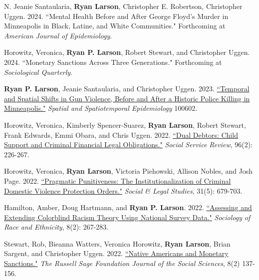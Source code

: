 \documentclass[letterpaper]{article}
\renewenvironment{itemize}{
  \begin{list}{}{
    \setlength{\leftmargin}{1.5em}
  }
}{
  \end{list}
}
\begin{document}
\begin{itemize}

\item N. Jeanie Santaularia, \textbf{Ryan Larson}, Christopher E. Robertson, Christopher Uggen. 2024. ``Mental Health Before and After George Floyd’s Murder in Minneapolis in Black, Latine, and White Communities." Forthcoming at \textit{American Journal of Epidemiology}. 

\item Horowitz, Veronica, \textbf{Ryan P. Larson}, Robert Stewart, and Christopher Uggen. 2024. ``Monetary Sanctions Across Three Generations." Forthcoming at \textit{Sociological Quarterly}.

\item \textbf{Ryan P. Larson}, Jeanie Santaularia, and Christopher Uggen. 2023. \href{https://ryanplarson.github.io/personal_site/pubs/larson_etal_23_online.pdf}{``Temporal and Spatial Shifts in Gun Violence, Before and After a Historic Police Killing in Minneapolis."} \textit{Spatial and Spatiotemporal Epidemiology} 100602.

\item Horowitz, Veronica, Kimberly Spencer-Suarez, \textbf{Ryan Larson}, Robert Stewart, Frank Edwards, Emmi Obara, and Chris Uggen. 2022. \href{https://ryanplarson.github.io/personal_site/pubs/horowitz_etal_22.pdf}{``Dual Debtors: Child Support and Criminal Financial Legal Obligations."} \textit{Social Service Review}, 96(2): 226-267.

\item Horowitz, Veronica,  \textbf{Ryan Larson}, Victoria Piehowski, Allison Nobles, and Josh Page. 2022. \href{https://ryanplarson.github.io/personal_site/pubs/horowitz_etal_21.pdf}{``Pragmatic Punitiveness: The Institutionalization of Criminal Domestic Violence Protection Orders."} \textit{Social \& Legal Studies}, 31(5): 679-703.

\item Hamilton, Amber, Doug Hartmann, and \textbf{Ryan P. Larson}. 2022. \href{https://ryanplarson.github.io/personal_site/pubs/hamilton_etal_22.pdf}{``Assessing and Extending Colorblind Racism Theory Using National Survey Data."} \textit{Sociology of Race and Ethnicity}, 8(2): 267-283.

\item Stewart, Rob, Bieanna Watters, Veronica Horowitz, \textbf{Ryan Larson}, Brian Sargent, and Christopher Uggen. 2022. \href{https://ryanplarson.github.io/personal_site/pubs/stewart_etal_22.pdf}{``Native Americans and Monetary Sanctions."} \textit{The Russell Sage Foundation Journal of the Social Sciences}, 8(2) 137-156.


\end{itemize}
\end{document}

